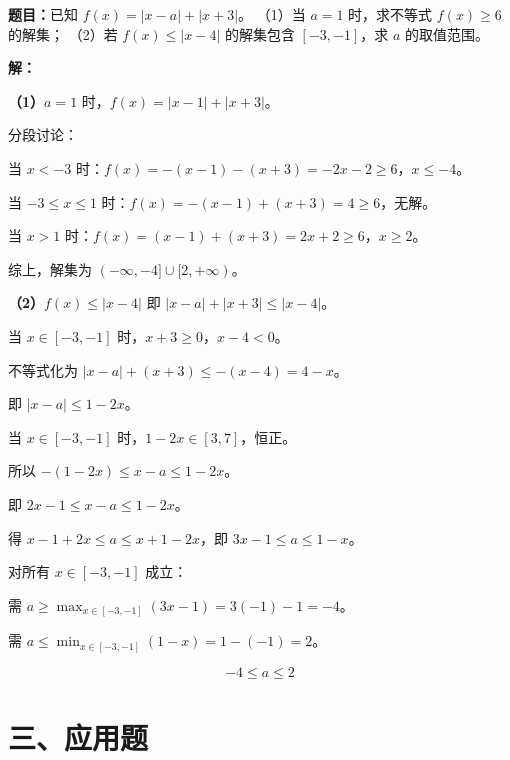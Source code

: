 \documentclass[12pt, a4paper]{ctexart}
\begin{document}
\begin{examplebox}[【例题12】构造法处理绝对值不等式]
\textbf{题目：}已知 $f(x) = |x - a| + |x + 3|$。
（1）当 $a = 1$ 时，求不等式 $f(x) \geq 6$ 的解集；
（2）若 $f(x) \leq |x - 4|$ 的解集包含 $[-3, -1]$，求 $a$ 的取值范围。

\medskip
\textbf{解：}

\textbf{（1）}$a = 1$ 时，$f(x) = |x - 1| + |x + 3|$。

分段讨论：

当 $x < -3$ 时：$f(x) = -(x-1) - (x+3) = -2x - 2 \geq 6$，$x \leq -4$。

当 $-3 \leq x \leq 1$ 时：$f(x) = -(x-1) + (x+3) = 4 \geq 6$，无解。

当 $x > 1$ 时：$f(x) = (x-1) + (x+3) = 2x + 2 \geq 6$，$x \geq 2$。

综上，解集为 $(-\infty, -4] \cup [2, +\infty)$。

\textbf{（2）}$f(x) \leq |x-4|$ 即 $|x-a| + |x+3| \leq |x-4|$。

当 $x \in [-3, -1]$ 时，$x + 3 \geq 0$，$x - 4 < 0$。

不等式化为 $|x - a| + (x+3) \leq -(x-4) = 4 - x$。

即 $|x - a| \leq 1 - 2x$。

当 $x \in [-3, -1]$ 时，$1 - 2x \in [3, 7]$，恒正。

所以 $-(1-2x) \leq x - a \leq 1 - 2x$。

即 $2x - 1 \leq x - a \leq 1 - 2x$。

得 $x - 1 + 2x \leq a \leq x + 1 - 2x$，即 $3x - 1 \leq a \leq 1 - x$。

对所有 $x \in [-3, -1]$ 成立：

需 $a \geq \max_{x \in [-3,-1]} (3x - 1) = 3(-1) - 1 = -4$。

需 $a \leq \min_{x \in [-3,-1]} (1 - x) = 1 - (-1) = 2$。

$$\boxed{-4 \leq a \leq 2}$$
\end{examplebox}

\section*{\textcolor{apppurple}{三、应用题}}
\end{document}
